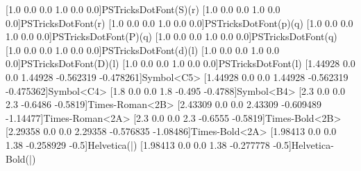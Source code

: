 [1.0 0.0 0.0 1.0 0.0 0.0]{PSTricksDotFont}{(S)}{(r)}
[1.0 0.0 0.0 1.0 0.0 0.0]{PSTricksDotFont}{(r)}
[1.0 0.0 0.0 1.0 0.0 0.0]{PSTricksDotFont}{(p)}{(q)}
[1.0 0.0 0.0 1.0 0.0 0.0]{PSTricksDotFont}{(P)}{(q)}
[1.0 0.0 0.0 1.0 0.0 0.0]{PSTricksDotFont}{(q)}
[1.0 0.0 0.0 1.0 0.0 0.0]{PSTricksDotFont}{(d)}{(l)}
[1.0 0.0 0.0 1.0 0.0 0.0]{PSTricksDotFont}{(D)}{(l)}
[1.0 0.0 0.0 1.0 0.0 0.0]{PSTricksDotFont}{(l)}
[1.44928 0.0 0.0 1.44928 -0.562319 -0.478261]{Symbol}{<C5>}
[1.44928 0.0 0.0 1.44928 -0.562319 -0.475362]{Symbol}{<C4>}
[1.8 0.0 0.0 1.8 -0.495 -0.4788]{Symbol}{<B4>}
\newpsfontdot{+}[2.3 0.0 0.0 2.3 -0.6486 -0.5819]{Times-Roman}{<2B>}
[2.43309 0.0 0.0 2.43309 -0.609489 -1.14477]{Times-Roman}{<2A>}
[2.3 0.0 0.0 2.3 -0.6555 -0.5819]{Times-Bold}{<2B>}
[2.29358 0.0 0.0 2.29358 -0.576835 -1.08486]{Times-Bold}{<2A>}
\newpsfontdot{|}[1.98413 0.0 0.0 1.38 -0.258929 -0.5]{Helvetica}{(|)}
[1.98413 0.0 0.0 1.38 -0.277778 -0.5]{Helvetica-Bold}{(|)}%

